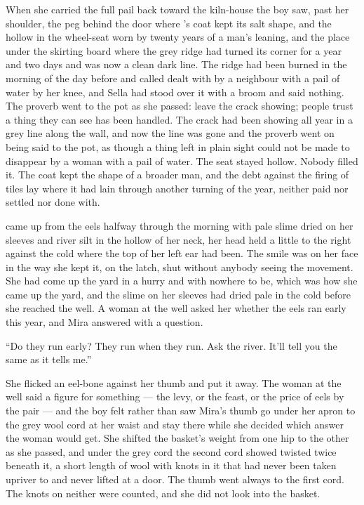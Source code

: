 When she carried the full pail back toward the kiln-house the boy saw, past her shoulder, the peg behind the door where 's coat kept its salt shape, and the hollow in the wheel-seat worn by twenty years of a man's leaning, and the place under the skirting board where the grey ridge had turned its corner for a year and two days and was now a clean dark line. The ridge had been burned in the morning of the day before and called dealt with by a neighbour with a pail of water by her knee, and Sella had stood over it with a broom and said nothing. The proverb went to the pot as she passed: leave the crack showing; people trust a thing they can see has been handled. The crack had been showing all year in a grey line along the wall, and now the line was gone and the proverb went on being said to the pot, as though a thing left in plain sight could not be made to disappear by a woman with a pail of water. The seat stayed hollow. Nobody filled it. The coat kept the shape of a broader man, and the debt against the firing of tiles lay where it had lain through another turning of the year, neither paid nor settled nor done with.

\scenebreak

 came up from the eels halfway through the morning with pale slime dried on her sleeves and river silt in the hollow of her neck, her head held a little to the right against the cold where the top of her left ear had been. The smile was on her face in the way she kept it, on the latch, shut without anybody seeing the movement. She had come up the yard in a hurry and with nowhere to be, which was how she came up the yard, and the slime on her sleeves had dried pale in the cold before she reached the well. A woman at the well asked her whether the eels ran early this year, and Mira answered with a question.

“Do they run early? They run when they run. Ask the river. It'll tell you the same as it tells me.”

She flicked an eel-bone against her thumb and put it away. The woman at the well said a figure for something --- the levy, or the feast, or the price of eels by the pair --- and the boy felt rather than saw Mira's thumb go under her apron to the grey wool cord at her waist and stay there while she decided which answer the woman would get. She shifted the basket's weight from one hip to the other as she passed, and under the grey cord the second cord showed twisted twice beneath it, a short length of wool with knots in it that had never been taken upriver to  and never lifted at a door. The thumb went always to the first cord. The knots on neither were counted, and she did not look into the basket.

